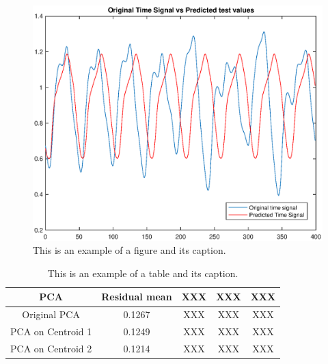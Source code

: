 \begin{figure}[!ht]
\includegraphics[clip,width=\columnwidth]{figures/PlotTimeSeriesResult}%
\caption[Graph.]{This is an example of a figure and its caption.}
\label{fig:timeseries}
\end{figure}

\begin{table}[!ht]
\renewcommand{\arraystretch}{1.50}
\caption[Table]{This is an example of a table and its caption.}
\label{tablePCA}
\centering
\begin{tabular}{| c | c | c | c | c |}
\hline
\bfseries PCA & \bfseries Residual mean & \bfseries XXX & \bfseries XXX & \bfseries XXX \\
\hline\hline
Original PCA & 0.1267 & XXX & XXX & XXX  \\
\hline
PCA on Centroid 1 & 0.1249 & XXX & XXX  & XXX\\
\hline
PCA on Centroid 2 & 0.1214  & XXX & XXX  & XXX\\
\hline
\end{tabular}
\end{table}

\newpage


